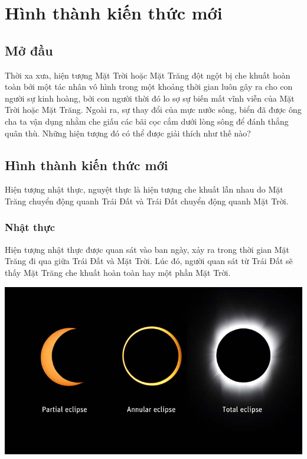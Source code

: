 \setcounter{section}{0}
\section{Hình thành kiến thức mới}

\subsection{Mở đầu}
Thời xa xưa, hiện tượng Mặt Trời hoặc Mặt Trăng đột ngột bị che khuất hoàn toàn bởi một tác nhân vô hình trong một khoảng thời gian luôn gây ra cho con người sự kinh hoàng, bởi con người thời đó lo sợ sự biến mất vĩnh viễn của Mặt Trời hoặc Mặt Trăng. Ngoài ra, sự thay đổi của mực nước sông, biển đã được ông cha ta vận dụng nhằm che giấu các bãi cọc cắm dưới lòng sông để đánh thắng quân thù. Những hiện tượng đó có thể được giải thích như thế nào?
\subsection{Hình thành kiến thức mới}

Hiện tượng nhật thực, nguyệt thực là hiện tượng che khuất lẫn nhau do Mặt Trăng chuyển động quanh Trái Đất và Trái Đất chuyển động quanh Mặt Trời.
\subsubsection{Nhật thực}
Hiện tượng nhật thực được quan sát vào ban ngày, xảy ra trong thời gian Mặt Trăng đi qua giữa Trái Đất và Mặt Trời. Lúc đó, người quan sát từ Trái Đất sẽ thấy Mặt Trăng che khuất hoàn toàn hay một phần Mặt Trời.
\begin{center}
	\includegraphics[width=0.6\linewidth]{../figs/G10-035-1}
\end{center}

